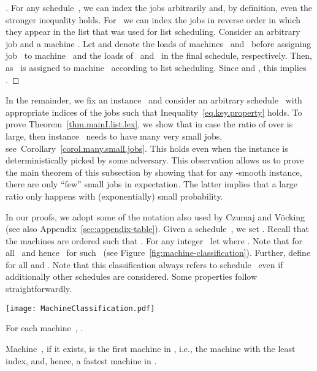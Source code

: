 \documentclass[a4paper,11pt,fleqn]{article}
\begin{document}
\begin{proof}[]
For any schedule~, we can index the jobs
arbitrarily and, by definition, even the stronger inequality  holds. For~ we can
index the jobs in reverse order in which they appear in the list that
was used for list scheduling.
Consider an arbitrary job  and a machine . Let  and  denote
the loads of machines~ and~ before assigning job~ to
machine~ and the loads of~ and~ in the final schedule,
respectively. Then, 
as~ is assigned to machine~ according to list scheduling. Since
 and , this implies .
\end{proof}

In the remainder, we fix an instance~ and consider an arbitrary
schedule~ with appropriate indices of the jobs
such that Inequality~\eqref{eq.key.property} holds.
To prove Theorem~\ref{thm.mainI.list.lex}, we show
that in case the ratio of  over  is large,
then instance~ needs to have many very small jobs,
see~Corollary~\ref{corol.many.small.jobs}.
This holds even when  the instance  is deterministically picked by some adversary.
This observation allows us to prove the main theorem of this subsection by showing that for any -smooth instance, there are only ``few'' small jobs in expectation. The latter implies that a large ratio only happens with (exponentially) small probability.



In our proofs, we adopt some of the notation also used by Czumaj and
V\"{o}cking~\cite{Voecking:2007} (see also Appendix~\ref{sec:appendix-table}). 
Given a schedule~, we set . Recall that the
machines are ordered such that . For any
integer~ let  where . Note that  for all~ and hence~ for such~ (see Figure~\ref{fig:machine-classification}). Further, define  for all  and .
Note that this classification always refers to schedule~ even if
additionally other schedules are considered. Some properties follow
straightforwardly.

\begin{artclfig}\newcommand{\height}{14em}
\texttt{[image: MachineClassification.pdf]}
\caption{Machine classification by Czumaj and V{\"o}cking}
\label{fig:machine-classification}
\end{artclfig}

\begin{property}
\label{prop:minimum-load}
For each machine~, .
\end{property}

\begin{property}
Machine~, if it exists, is the first machine in , i.e., the machine with the least index,
and, hence, a fastest machine in .
\end{property}
\end{document}
